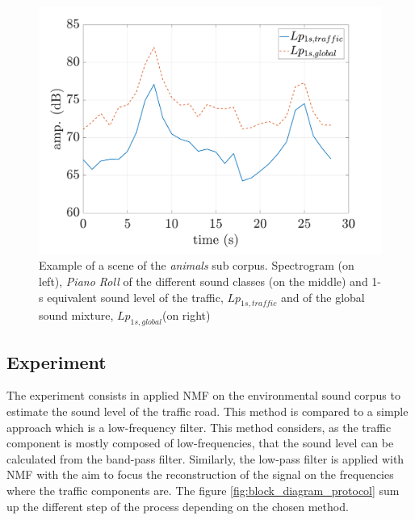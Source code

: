\documentclass[twocolumn,a4paper,10pt]{article}
\begin{document}
\begin{figure}
\begin{minipage}[c]{.32\linewidth}
      \includegraphics[width =\linewidth]{../image/evolutionLpExample.pdf} 

   \end{minipage}
\caption{Example of a scene of the \textit{animals} sub corpus. Spectrogram (on left), \textit{Piano Roll} of the different sound classes (on the middle) and 1-s equivalent sound level of the traffic, $Lp_{1s,traffic}$ and of the global sound mixture, $Lp_{1s,global}$(on right)}
\label{fig:exampleScene}
\end{figure}

\subsection{Experiment}

The experiment consists in applied NMF on the environmental sound corpus to estimate the sound level of the traffic road. This method is compared to a simple approach which is a low-frequency filter. This method considers, as the traffic component is mostly composed of low-frequencies, that the sound level can be calculated from the band-pass filter. Similarly, the low-pass filter is applied with NMF with the aim to focus the reconstruction of the signal on the frequencies where the traffic components are. The figure \ref{fig:block_diagram_protocol} sum up the different step of the process depending on the chosen method.\\
\end{document}
